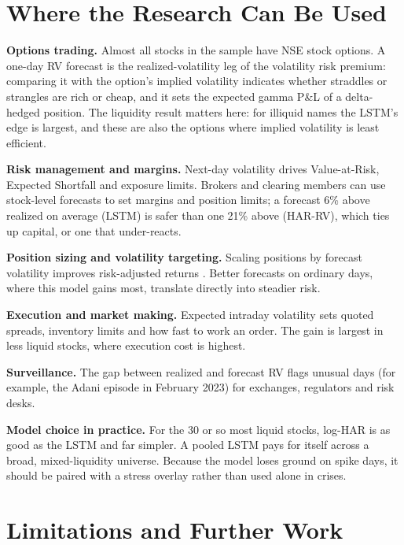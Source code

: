 \section{Where the Research Can Be Used}

\textbf{Options trading.} Almost all stocks in the sample have NSE stock options. A one-day RV forecast
is the realized-volatility leg of the volatility risk premium: comparing it with the option's implied
volatility indicates whether straddles or strangles are rich or cheap, and it sets the expected gamma
P\&L of a delta-hedged position. The liquidity result matters here: for illiquid names the LSTM's edge is
largest, and these are also the options where implied volatility is least efficient.

\textbf{Risk management and margins.} Next-day volatility drives Value-at-Risk, Expected Shortfall and
exposure limits. Brokers and clearing members can use stock-level forecasts to set margins and position
limits; a forecast 6\% above realized on average (LSTM) is safer than one 21\% above (HAR-RV), which ties up
capital, or one that under-reacts.

\textbf{Position sizing and volatility targeting.} Scaling positions by forecast volatility improves
risk-adjusted returns \citep{fleming2001,moreira2017}. Better forecasts on ordinary days, where this
model gains most, translate directly into steadier risk.

\textbf{Execution and market making.} Expected intraday volatility sets quoted spreads, inventory limits
and how fast to work an order. The gain is largest in less liquid stocks, where execution cost is highest.

\textbf{Surveillance.} The gap between realized and forecast RV flags unusual days (for example, the Adani
episode in February 2023) for exchanges, regulators and risk desks.

\textbf{Model choice in practice.} For the 30 or so most liquid stocks, log-HAR is as good as the LSTM and
far simpler. A pooled LSTM pays for itself across a broad, mixed-liquidity universe. Because the model
loses ground on spike days, it should be paired with a stress overlay rather than used alone in crises.

\section{Limitations and Further Work}

